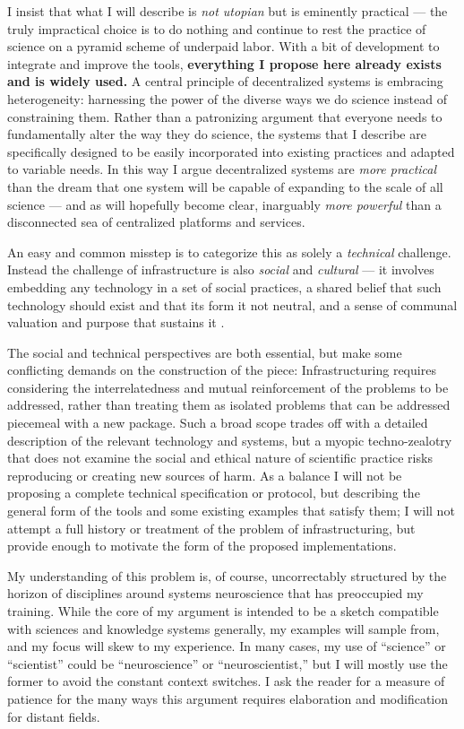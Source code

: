 \documentclass[notoc]{tufte-book}
\begin{document}
I insist that what I will describe is \emph{not utopian} but is
eminently practical --- the truly impractical choice is to do nothing
and continue to rest the practice of science on a pyramid scheme \citep{ponziSciencePyramidScheme2020}  of underpaid labor. With a bit
of development to integrate and improve the tools, \textbf{everything I
propose here already exists and is widely used.} A central principle of
decentralized systems is embracing heterogeneity: harnessing the power
of the diverse ways we do science instead of constraining them. Rather
than a patronizing argument that everyone needs to fundamentally alter
the way they do science, the systems that I describe are specifically
designed to be easily incorporated into existing practices and adapted
to variable needs. In this way I argue decentralized systems are
\emph{more practical} than the dream that one system will be capable of
expanding to the scale of all science --- and as will hopefully become
clear, inarguably \emph{more powerful} than a disconnected sea of
centralized platforms and services.

An easy and common misstep is to categorize this as solely a
\emph{technical} challenge. Instead the challenge of infrastructure is
also \emph{social} and \emph{cultural} --- it involves embedding any
technology in a set of social practices, a shared belief that such
technology should exist and that its form it not neutral, and a sense of
communal valuation and purpose that sustains it \citep{bietzSustainingDevelopmentCyberinfrastructure2012} .

The social and technical perspectives are both essential, but make some
conflicting demands on the construction of the piece: Infrastructuring
requires considering the interrelatedness and mutual reinforcement of
the problems to be addressed, rather than treating them as isolated
problems that can be addressed piecemeal with a new package. Such a
broad scope trades off with a detailed description of the relevant
technology and systems, but a myopic techno-zealotry that does not
examine the social and ethical nature of scientific practice risks
reproducing or creating new sources of harm. As a balance I will not be
proposing a complete technical specification or protocol, but describing
the general form of the tools and some existing examples that satisfy
them; I will not attempt a full history or treatment of the problem of
infrastructuring, but provide enough to motivate the form of the
proposed implementations.

My understanding of this problem is, of course, uncorrectably structured
by the horizon of disciplines around systems neuroscience that has
preoccupied my training. While the core of my argument is intended to be
a sketch compatible with sciences and knowledge systems generally, my
examples will sample from, and my focus will skew to my experience. In
many cases, my use of ``science'' or ``scientist'' could be
``neuroscience'' or ``neuroscientist,'' but I will mostly use the former
to avoid the constant context switches. I ask the reader for a measure
of patience for the many ways this argument requires elaboration and
modification for distant fields. 
\end{document}
